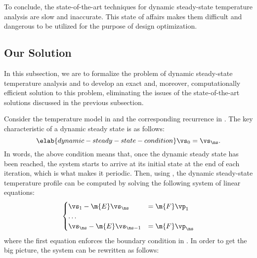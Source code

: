 To conclude, the state-of-the-art techniques for dynamic steady-state
temperature analysis are slow and inaccurate. This state of affairs makes them
difficult and dangerous to be utilized for the purpose of design optimization.

\subsection{Our Solution}

In this subsection, we are to formalize the problem of dynamic steady-state
temperature analysis and to develop an exact and, moreover, computationally
efficient solution to this problem, eliminating the issues of the
state-of-the-art solutions discussed in the previous subsection.

Consider the temperature model in  and the corresponding
recurrence in . The key characteristic of a
dynamic steady state is as follows:
\begin{equation} \elab{dynamic-steady-state-condition}
  \vs_0 = \vs_\ns.
\end{equation}
In words, the above condition means that, once the dynamic steady state has been
reached, the system starts to arrive at its initial state at the end of each
iteration, which is what makes it periodic. Then, using
, the dynamic steady-state temperature profile
can be computed by solving the following system of linear equations:
\[
  \begin{cases}
    \vs_1 - \m{E} \vs_\ns & = \m{F} \vp_1 \\
    \dots \\
    \vs_\ns - \m{E} \vs_{\ns - 1} & = \m{F} \vp_\ns
  \end{cases}
\]
where the first equation enforces the boundary condition in
. In order to get the big picture, the
system can be rewritten as follows:
